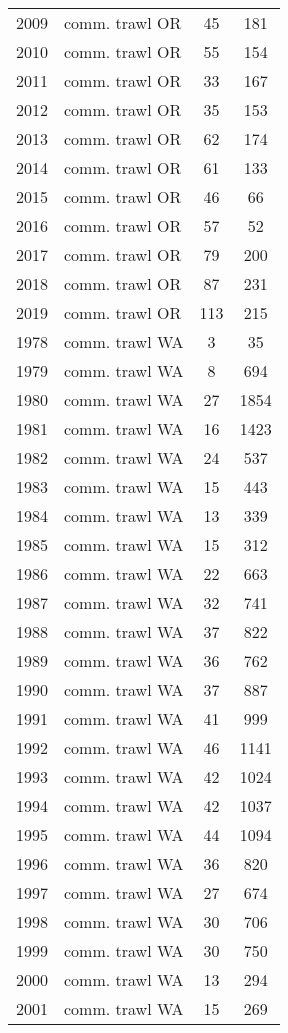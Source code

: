 \begin{longtable}[t]{c>{\centering\arraybackslash}p{4cm}cc}
2009 & comm. trawl OR & 45 & 181\\
2010 & comm. trawl OR & 55 & 154\\
2011 & comm. trawl OR & 33 & 167\\
2012 & comm. trawl OR & 35 & 153\\
2013 & comm. trawl OR & 62 & 174\\
2014 & comm. trawl OR & 61 & 133\\
2015 & comm. trawl OR & 46 & 66\\
2016 & comm. trawl OR & 57 & 52\\
2017 & comm. trawl OR & 79 & 200\\
2018 & comm. trawl OR & 87 & 231\\
2019 & comm. trawl OR & 113 & 215\\
1978 & comm. trawl WA & 3 & 35\\
1979 & comm. trawl WA & 8 & 694\\
1980 & comm. trawl WA & 27 & 1854\\
1981 & comm. trawl WA & 16 & 1423\\
1982 & comm. trawl WA & 24 & 537\\
1983 & comm. trawl WA & 15 & 443\\
1984 & comm. trawl WA & 13 & 339\\
1985 & comm. trawl WA & 15 & 312\\
1986 & comm. trawl WA & 22 & 663\\
1987 & comm. trawl WA & 32 & 741\\
1988 & comm. trawl WA & 37 & 822\\
1989 & comm. trawl WA & 36 & 762\\
1990 & comm. trawl WA & 37 & 887\\
1991 & comm. trawl WA & 41 & 999\\
1992 & comm. trawl WA & 46 & 1141\\
1993 & comm. trawl WA & 42 & 1024\\
1994 & comm. trawl WA & 42 & 1037\\
1995 & comm. trawl WA & 44 & 1094\\
1996 & comm. trawl WA & 36 & 820\\
1997 & comm. trawl WA & 27 & 674\\
1998 & comm. trawl WA & 30 & 706\\
1999 & comm. trawl WA & 30 & 750\\
2000 & comm. trawl WA & 13 & 294\\
2001 & comm. trawl WA & 15 & 269\\

\end{longtable}
